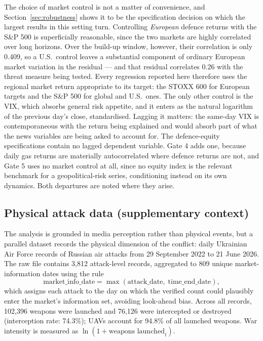 \documentclass[12pt,a4paper]{article}
\begin{document}
The choice of market control is not a matter of convenience, and Section~\ref{sec:robustness} shows it to be the specification decision on which the largest results in this setting turn. Controlling \textit{European} defence returns with the S\&P 500 is superficially reasonable, since the two markets are highly correlated over long horizons. Over the build-up window, however, their correlation is only 0.409, so a U.S.\ control leaves a substantial component of ordinary European market variation in the residual --- and that residual correlates 0.26 with the threat measure being tested. Every regression reported here therefore uses the regional market return appropriate to its target: the STOXX 600 for European targets and the S\&P 500 for global and U.S.\ ones. The only other control is the VIX, which absorbs general risk appetite, and it enters as the natural logarithm of the previous day's close, standardised. Lagging it matters: the same-day VIX is contemporaneous with the return being explained and would absorb part of what the news variables are being asked to account for. The defence-equity specifications contain no lagged dependent variable. Gate 4 adds one, because daily gas returns are materially autocorrelated where defence returns are not, and Gate 5 uses no market control at all, since no equity index is the relevant benchmark for a geopolitical-risk series, conditioning instead on its own dynamics. Both departures are noted where they arise.

\subsection{Physical attack data (supplementary context)}
\label{sec:attacks}

The analysis is grounded in media perception rather than physical events, but a parallel dataset records the physical dimension of the conflict: daily Ukrainian Air Force records of Russian air attacks from 29 September 2022 to 21 June 2026. The raw file contains 3,812 attack-level records, aggregated to 809 unique market-information dates using the rule
\begin{equation}
\text{market\_info\_date} = \max(\text{attack\_date},\; \text{time\_end\_date}),
\end{equation}
which assigns each attack to the day on which the verified count could plausibly enter the market's information set, avoiding look-ahead bias. Across all records, 102,396 weapons were launched and 76,126 were intercepted or destroyed (interception rate: 74.3\%); UAVs account for 94.8\% of all launched weapons. War intensity is measured as $\ln(1 + \text{weapons launched}_t)$.
\end{document}
